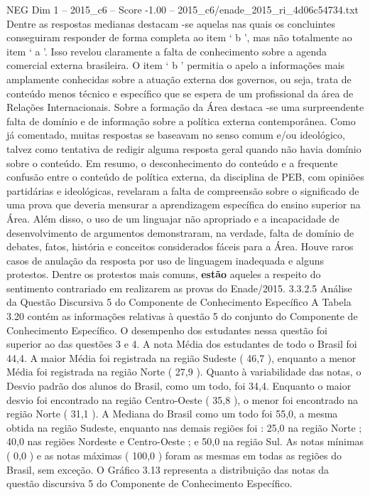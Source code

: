\begin{textsample}{NEG Dim 1 – 2015\_c6 – Score -1.00 – 2015\_c6/enade\_2015\_ri\_4d06c54734.txt}
Dentre as respostas medianas destacam -se aquelas nas quais os concluintes conseguiram responder de forma completa ao item ‘ b ’, mas não totalmente ao item ‘ a ’.
Isso revelou claramente a falta de conhecimento sobre a agenda comercial externa brasileira.
O item ‘ b ’ permitia o apelo a informações mais amplamente conhecidas sobre a atuação externa dos governos, ou seja, trata de conteúdo menos técnico e específico que se espera de um profissional da área de Relações Internacionais.
Sobre a formação da Área destaca -se uma surpreendente falta de domínio e de informação sobre a política externa contemporânea.
Como já comentado, muitas respostas se baseavam no senso comum e/ou ideológico, talvez como tentativa de redigir alguma resposta geral quando não havia domínio sobre o conteúdo.
Em resumo, o desconhecimento do conteúdo e a frequente confusão entre o conteúdo de política externa, da disciplina de PEB, com opiniões partidárias e ideológicas, revelaram a falta de compreensão sobre o significado de uma prova que deveria mensurar a aprendizagem específica do ensino superior na Área.
Além disso, o uso de um linguajar não apropriado e a incapacidade de desenvolvimento de argumentos demonstraram, na verdade, falta de domínio de debates, fatos, história e conceitos considerados fáceis para a Área.
Houve raros casos de anulação da resposta por uso de linguagem inadequada e alguns protestos.
Dentre os protestos mais comuns, \textbf{estão} aqueles a respeito do sentimento contrariado em realizarem as provas do Enade/2015. 3.3.2.5 Análise da Questão Discursiva 5 do Componente de Conhecimento Específico A Tabela 3.20 contém as informações relativas à questão 5 do conjunto do Componente de Conhecimento Específico.
O desempenho dos estudantes nessa questão foi superior ao das questões 3 e 4.
A nota Média dos estudantes de todo o Brasil foi 44,4.
A maior Média foi registrada na região Sudeste ( 46,7 ), enquanto a menor Média foi registrada na região Norte ( 27,9 ).
Quanto à variabilidade das notas, o Desvio padrão dos alunos do Brasil, como um todo, foi 34,4.
Enquanto o maior desvio foi encontrado na região Centro-Oeste ( 35,8 ), o menor foi encontrado na região Norte ( 31,1 ).
A Mediana do Brasil como um todo foi 55,0, a mesma obtida na região Sudeste, enquanto nas demais regiões foi : 25,0 na região Norte ; 40,0 nas regiões Nordeste e Centro-Oeste ; e 50,0 na região Sul.
As notas mínimas ( 0,0 ) e as notas máximas ( 100,0 ) foram as mesmas em todas as regiões do Brasil, sem exceção.
O Gráfico 3.13 representa a distribuição das notas da questão discursiva 5 do Componente de Conhecimento Específico.

\end{textsample}
